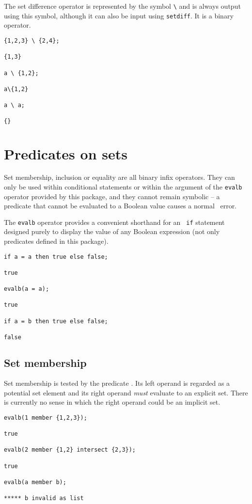 The set difference operator is represented by the symbol \verb|\| and
is always output using this symbol, although it can also be input using
 {\tt setdiff}.  It is a binary operator.

\begin{verbatim}
{1,2,3} \ {2,4};

{1,3}

a \ {1,2};

a\{1,2}

a \ a;

{}

\end{verbatim}

\section{Predicates on sets}

Set membership, inclusion or equality are all binary infix operators.
They can only be used within conditional statements or within the
argument of the {\tt evalb} operator provided by this
package, and they cannot remain symbolic -- a predicate that cannot be
evaluated to a Boolean value causes a normal \REDUCE\ error.

The {\tt evalb} operator provides a convenient shorthand for an {\tt
if} statement designed purely to display the value of any Boolean
expression (not only predicates defined in this package).
\begin{verbatim}
if a = a then true else false;

true

evalb(a = a);

true

if a = b then true else false;

false
\end{verbatim}


\subsection{Set membership}

Set membership is tested by the predicate .
Its left operand is regarded as a potential set element and
its right operand {\em must\/} evaluate to an explicit set.  There is
currently no sense in which the right operand could be an implicit set.
\begin{verbatim}
evalb(1 member {1,2,3});

true

evalb(2 member {1,2} intersect {2,3});

true

evalb(a member b);

***** b invalid as list
\end{verbatim}

